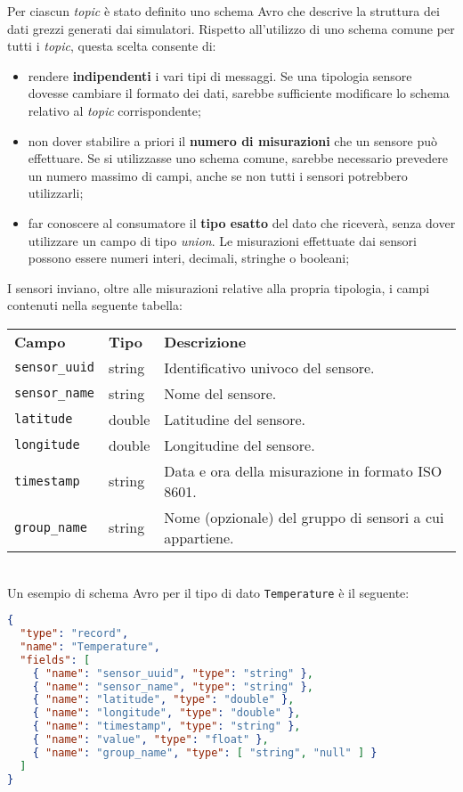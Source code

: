 Per ciascun \textit{topic} è stato definito uno schema Avro che descrive la struttura dei dati grezzi generati dai simulatori. Rispetto all'utilizzo di uno schema comune per tutti i \textit{topic},
questa scelta consente di:
\begin{itemize}
	\item rendere \textbf{indipendenti} i vari tipi di messaggi. Se una tipologia sensore dovesse cambiare il formato dei dati, sarebbe sufficiente modificare lo schema relativo al \textit{topic} corrispondente;
	\item non dover stabilire a priori il \textbf{numero di misurazioni} che un sensore può effettuare. Se si utilizzasse uno schema comune, sarebbe necessario prevedere un numero massimo di campi, anche se non tutti i sensori potrebbero utilizzarli;
	\item far conoscere al consumatore il \textbf{tipo esatto} del dato che riceverà, senza dover utilizzare un campo di tipo \textit{union}. Le misurazioni effettuate dai sensori possono essere numeri interi, decimali, stringhe o booleani;
\end{itemize}
\pagebreak
I sensori inviano, oltre alle misurazioni relative alla propria tipologia, i campi contenuti nella seguente tabella:
\begin{table}[ht]
	\begin{tabular}{lll}
		\textbf{Campo}        & \textbf{Tipo} & \textbf{Descrizione}                                     \\
		\texttt{sensor\_uuid} & string        & Identificativo univoco del sensore.                      \\
		\texttt{sensor\_name} & string        & Nome del sensore.                                        \\
		\texttt{latitude}     & double        & Latitudine del sensore.                                  \\
		\texttt{longitude}    & double        & Longitudine del sensore.                                 \\
		\texttt{timestamp}    & string        & Data e ora della misurazione in formato ISO 8601.        \\
		\texttt{group\_name}  & string        & Nome (opzionale) del gruppo di sensori a cui appartiene. \\
	\end{tabular}
\end{table}
\\
Un esempio di schema Avro per il tipo di dato \texttt{Temperature} è il seguente:
\begin{lstlisting}[language=json, caption=Esempio di schema Avro per il tipo di dato \texttt{Temperature},captionpos=b]
{
  "type": "record",
  "name": "Temperature",
  "fields": [
    { "name": "sensor_uuid", "type": "string" },
    { "name": "sensor_name", "type": "string" },
    { "name": "latitude", "type": "double" },
    { "name": "longitude", "type": "double" },
    { "name": "timestamp", "type": "string" },
    { "name": "value", "type": "float" },
    { "name": "group_name", "type": [ "string", "null" ] }
  ]
}
\end{lstlisting}

